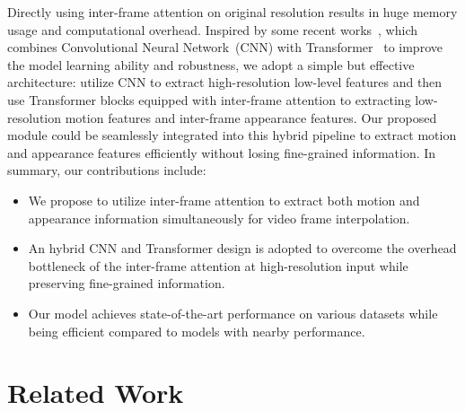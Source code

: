 \documentclass[10pt,twocolumn,letterpaper]{article}
\begin{document}
        Directly using inter-frame attention on original resolution results in huge memory usage and computational overhead. Inspired by some recent works~\cite{wang2022convolutional,d2021convit,dai2021coatnet,li2021localvit,wu2021cvt,xiao2021early,yuan2021incorporating}, which combines Convolutional Neural Network~(CNN) with Transformer~\cite{vaswani2017attention} to improve the model learning ability and robustness, we adopt a simple but effective architecture: utilize CNN to extract high-resolution low-level features and then use Transformer blocks equipped with inter-frame attention to extracting low-resolution motion features and inter-frame appearance features. Our proposed module could be seamlessly integrated into this hybrid pipeline to extract motion and appearance features efficiently without losing fine-grained information. In summary, our contributions include: 
        \begin{itemize}
            \item We propose to utilize inter-frame attention to extract both motion and appearance information simultaneously for video frame interpolation.
            \item An hybrid CNN and Transformer design is adopted to overcome the overhead bottleneck of the inter-frame attention at high-resolution input while preserving fine-grained information.
            \item Our model achieves state-of-the-art performance on various datasets while being efficient compared to models with nearby performance.
        \end{itemize}


\section{Related Work}
	
\end{document}
